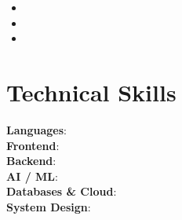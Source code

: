 \documentclass[a4paper,11pt]{article}
\newcommand{\entry}[2]{\noindent\textbf{#1}\hfill{#2}\par}
\newcommand{\subentry}[2]{\noindent\textit{#1}\hfill{\textit{#2}}\par\vspace{2pt}}
\begin{document}
\entry{}{} %
\subentry{}{} %
\begin{itemize}
  \item %
  \item %
  \item %
\end{itemize}

\section{Technical Skills}
\noindent
\textbf{Languages}: \\ %
\textbf{Frontend}: \\ %
\textbf{Backend}: \\ %
\textbf{AI / ML}: \\ %
\textbf{Databases \& Cloud}: \\ %
\textbf{System Design}: \\ %
\end{document}
